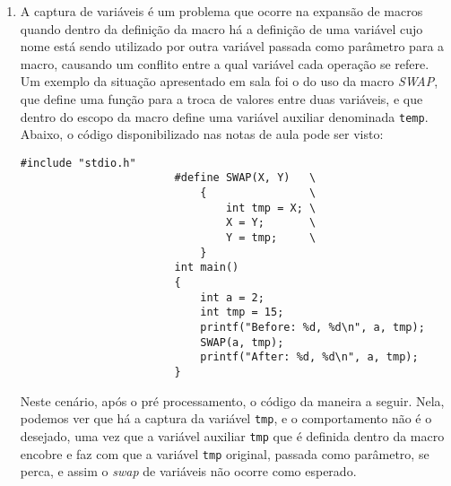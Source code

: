 \documentclass{article}
\begin{document}
\begin{enumerate}
\begin{enumerate}[label = (\alph*)]
\begin{lstlisting}[style=CStyle]
                    \end{lstlisting}
              \item
                    A captura de variáveis é um problema que ocorre na expansão
                    de macros quando dentro da definição da macro há
                    a definição de uma variável cujo nome está sendo utilizado
                    por outra variável passada como parâmetro para a macro,
                    causando
                    um conflito entre a qual variável cada operação se refere.
                    Um exemplo da situação apresentado em sala foi
                    o do uso da macro \textit{SWAP}, que define uma função para
                    a troca de valores entre duas variáveis, e que dentro do
                    escopo
                    da macro define uma variável auxiliar denominada
                    \texttt{temp}. Abaixo, o código disponibilizado nas notas
                    de aula
                    pode ser visto:

                    \begin{lstlisting}[style=CStyle]
                        #include "stdio.h"
                        #define SWAP(X, Y)   \
                            {                \
                                int tmp = X; \
                                X = Y;       \
                                Y = tmp;     \
                            }
                        int main()
                        {
                            int a = 2;
                            int tmp = 15;
                            printf("Before: %d, %d\n", a, tmp);
                            SWAP(a, tmp);
                            printf("After: %d, %d\n", a, tmp);
                        }
                    \end{lstlisting}

                    Neste cenário, após o pré processamento, o código da
                    maneira a seguir. Nela, podemos ver que
                    há a captura da variável \texttt{tmp}, e o comportamento
                    não é o desejado, uma vez que a variável auxiliar
                    \texttt{tmp} que é definida dentro da macro encobre e faz
                    com que a variável \texttt{tmp} original, passada como
                    parâmetro, se perca, e assim o \textit{swap} de variáveis
                    não ocorre como esperado.


\end{enumerate}
\end{enumerate}
\end{document}
